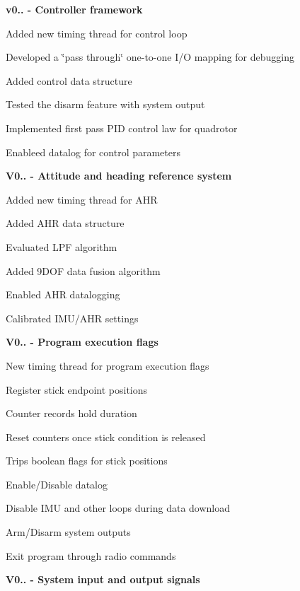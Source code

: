 \begin{DoxyItemize}
\item {\bfseries  v0.. -\/ Controller framework } 
\begin{DoxyItemize}
\item Added new timing thread for control loop  
\item Developed a \char`\"{}pass through\char`\"{} one-\/to-\/one I/O mapping for debugging  
\item Added control data structure  
\item Tested the disarm feature with system output  
\item Implemented first pass P\+ID control law for quadrotor  
\item Enableed datalog for control parameters  
\end{DoxyItemize}
\item {\bfseries  V0.. -\/ Attitude and heading reference system } 
\begin{DoxyItemize}
\item Added new timing thread for A\+HR  
\item Added A\+HR data structure  
\item Evaluated L\+PF algorithm  
\item Added 9\+D\+OF data fusion algorithm  
\item Enabled A\+HR datalogging  
\item Calibrated I\+M\+U/\+A\+HR settings  
\end{DoxyItemize}
\item {\bfseries  V0.. -\/ Program execution flags } 
\begin{DoxyItemize}
\item New timing thread for program execution flags  
\item Register stick endpoint positions  
\item Counter records hold duration  
\item Reset counters once stick condition is released  
\item Trips boolean flags for stick positions  
\item Enable/\+Disable datalog  
\item Disable I\+MU and other loops during data download  
\item Arm/\+Disarm system outputs  
\item Exit program through radio commands  
\end{DoxyItemize}
\item {\bfseries  V0.. -\/ System input and output signals } 

\end{DoxyItemize}
